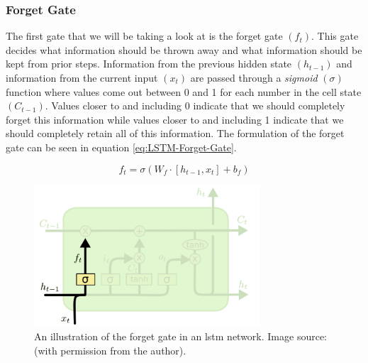 \subsubsection{Forget Gate}
\label{subsubsec:Background-Information:Forecasting-Models:Long-Short-Term-Memory-Networks:Forget-Gate}
The first gate that we will be taking a look at is the forget gate $(f_t)$. This gate decides what information should be thrown away and what information should be kept from prior steps. Information from the previous hidden state $(h_{t-1})$ and information from the current input $(x_t)$ are passed through a \textit{sigmoid} $(\sigma)$ function where values come out between 0 and 1 for each number in the cell state $(C_{t-1})$. Values closer to and including 0 indicate that we should completely forget this information while values closer to and including 1 indicate that we should completely retain all of this information. The formulation of the forget gate can be seen in equation \ref{eq:LSTM-Forget-Gate}.

\begin{equation}
    f_t = \sigma (W_f \cdot \left[h_{t-1}, x_t\right] + b_f)
\label{eq:LSTM-Forget-Gate}
\end{equation}

\begin{figure}[hbt!]
    \centering
    \includegraphics[width=0.75\textwidth]{Images/Chapter 3/LSTM/LSTM-Forget-Gate-Illustration.png}
    \caption{An illustration of the forget gate in an \gls{lstm} network. Image source: \cite{Colah}  (with permission from the author).}
    \label{fig:LSTM-Forget-Gate-Illustration}
\end{figure}

